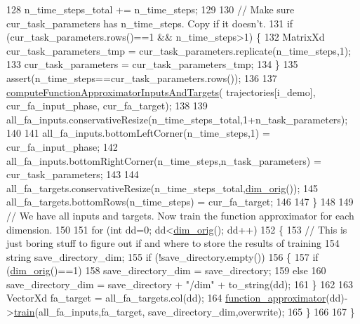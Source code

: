 \begin{DoxyCode}
128             n\_time\_steps\_total += n\_time\_steps;
129 
130             \textcolor{comment}{// Make sure cur\_task\_parameters has n\_time\_steps. Copy if it doesn't.}
131             \textcolor{keywordflow}{if} (cur\_task\_parameters.rows()==1 && n\_time\_steps>1) \{      
132                 MatrixXd cur\_task\_parameters\_tmp = cur\_task\_parameters.replicate(n\_time\_steps,1);
133                 cur\_task\_parameters = cur\_task\_parameters\_tmp;
134             \}
135             assert(n\_time\_steps==cur\_task\_parameters.rows());
136 
137             \hyperlink{classDmpBbo_1_1Dmp_a9aef6cbf41e55caa12b62cff77cf1fda}{computeFunctionApproximatorInputsAndTargets}(
      trajectories[i\_demo], cur\_fa\_input\_phase, cur\_fa\_target);
138 
139             all\_fa\_inputs.conservativeResize(n\_time\_steps\_total,1+n\_task\_parameters);
140 
141             all\_fa\_inputs.bottomLeftCorner(n\_time\_steps,1) = cur\_fa\_input\_phase;
142             all\_fa\_inputs.bottomRightCorner(n\_time\_steps,n\_task\_parameters) = cur\_task\_parameters;
143 
144             all\_fa\_targets.conservativeResize(n\_time\_steps\_total,\hyperlink{group__DynamicalSystems_ga93d7cbbf2e471b00f124e41706405a05}{dim\_orig}());
145             all\_fa\_targets.bottomRows(n\_time\_steps) = cur\_fa\_target;
146 
147         \}
148 
149         \textcolor{comment}{// We have all inputs and targets. Now train the function approximator for each dimension.}
150 
151         \textcolor{keywordflow}{for} (\textcolor{keywordtype}{int} dd=0; dd<\hyperlink{group__DynamicalSystems_ga93d7cbbf2e471b00f124e41706405a05}{dim\_orig}(); dd++)
152         \{
153             \textcolor{comment}{// This is just boring stuff to figure out if and where to store the results of training}
154             \textcolor{keywordtype}{string} save\_directory\_dim;
155             \textcolor{keywordflow}{if} (!save\_directory.empty())
156             \{
157                 \textcolor{keywordflow}{if} (\hyperlink{group__DynamicalSystems_ga93d7cbbf2e471b00f124e41706405a05}{dim\_orig}()==1)
158                     save\_directory\_dim = save\_directory;
159                 \textcolor{keywordflow}{else}
160                     save\_directory\_dim = save\_directory + \textcolor{stringliteral}{"/dim"} + to\_string(dd);
161             \}
162 
163             VectorXd fa\_target = all\_fa\_targets.col(dd);
164             \hyperlink{classDmpBbo_1_1Dmp_ac428e2dd848c99ddaf517f2dbacdf3ad}{function\_approximator}(dd)->\hyperlink{classDmpBbo_1_1FunctionApproximator_a9781476c7d296da4aaf50e74cd273a75}{train}(all\_fa\_inputs,fa\_target,
      save\_directory\_dim,overwrite);
165         \}
166 
167     \}
\end{DoxyCode}


